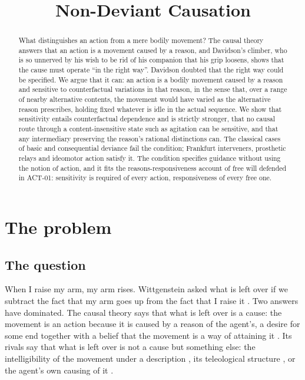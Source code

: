 \documentclass{situationist-preprint}
\title{Non-Deviant Causation}
\begin{document}
\maketitle

\begin{abstract}
What distinguishes an action from a mere bodily movement? The causal theory answers that an action is a movement caused by a reason, and Davidson's climber, who is so unnerved by his wish to be rid of his companion that his grip loosens, shows that the cause must operate \enquote{in the right way}. Davidson doubted that the right way could be specified. We argue that it can: an action is a bodily movement caused by a reason and sensitive to counterfactual variations in that reason, in the sense that, over a range of nearby alternative contents, the movement would have varied as the alternative reason prescribes, holding fixed whatever is idle in the actual sequence. We show that sensitivity entails counterfactual dependence and is strictly stronger, that no causal route through a content-insensitive state such as agitation can be sensitive, and that any intermediary preserving the reason's rational distinctions can. The classical cases of basic and consequential deviance fail the condition; Frankfurt interveners, prosthetic relays and ideomotor action satisfy it. The condition specifies guidance without using the notion of action, and it fits the reasons-responsiveness account of free will defended in ACT-01: sensitivity is required of every action, responsiveness of every free one.
\end{abstract}

\section{The problem}\label{s:problem}

\subsection{The question}

When I raise my arm, my arm rises. Wittgenstein asked what is left over if we subtract the fact that my arm goes up from the fact that I raise it \citep[\S 621]{Wittgenstein1953}. Two answers have dominated. The causal theory says that what is left over is a cause: the movement is an action because it is caused by a reason of the agent's, a desire for some end together with a belief that the movement is a way of attaining it \citep{Davidson1963}. Its rivals say that what is left over is not a cause but something else: the intelligibility of the movement under a description \citep{Anscombe1957,Melden1961}, its teleological structure \citep{Wilson1989,Sehon2005}, or the agent's own causing of it \citep{Hyman2015,Steward2012}.
\end{document}
